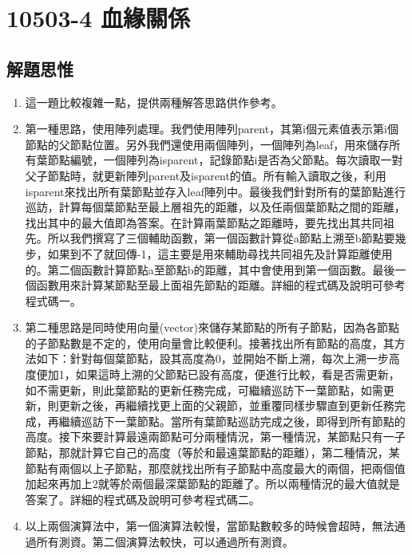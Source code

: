 \section{10503-4 血緣關係}

\subsection{解題思惟}
\begin{enumerate}
	\item 這一題比較複雜一點，提供兩種解答思路供作參考。
	\item 第一種思路，使用陣列處理。我們使用陣列parent，其第i個元素值表示第i個節點的父節點位置。另外我們還使用兩個陣列，一個陣列為leaf，用來儲存所有葉節點編號，一個陣列為isparent，記錄節點i是否為父節點。每次讀取一對父子節點時，就更新陣列parent及isparent的值。所有輸入讀取之後，利用isparent來找出所有葉節點並存入leaf陣列中。最後我們針對所有的葉節點進行巡訪，計算每個葉節點至最上層祖先的距離，以及任兩個葉節點之間的距離，找出其中的最大值即為答案。在計算兩葉節點之距離時，要先找出其共同祖先。所以我們撰寫了三個輔助函數，第一個函數計算從a節點上溯至b節點要幾步，如果到不了就回傳-1，這主要是用來輔助尋找共同祖先及計算距離使用的。第二個函數計算節點a至節點b的距離，其中會使用到第一個函數。最後一個函數用來計算某節點至最上面祖先節點的距離。詳細的程式碼及說明可參考程式碼一。
	\item 第二種思路是同時使用向量(vector)來儲存某節點的所有子節點，因為各節點的子節點數是不定的，使用向量會比較便利。接著找出所有節點的高度，其方法如下：針對每個葉節點，設其高度為0，並開始不斷上溯，每次上溯一步高度便加1，如果這時上溯的父節點已設有高度，便進行比較，看是否需更新，如不需更新，則此葉節點的更新任務完成，可繼續巡訪下一葉節點，如需更新，則更新之後，再繼續找更上面的父親節，並重覆同樣步驟直到更新任務完成，再繼續巡訪下一葉節點。當所有葉節點巡訪完成之後，即得到所有節點的高度。接下來要計算最遠兩節點可分兩種情況，第一種情況，某節點只有一子節點，那就計算它自己的高度（等於和最遠葉節點的距離），第二種情況，某節點有兩個以上子節點，那麼就找出所有子節點中高度最大的兩個，把兩個值加起來再加上2就等於兩個最深葉節點的距離了。所以兩種情況的最大值就是答案了。詳細的程式碼及說明可參考程式碼二。
	\item 以上兩個演算法中，第一個演算法較慢，當節點數較多的時候會超時，無法通過所有測資。第二個演算法較快，可以通過所有測資。
\end{enumerate}

